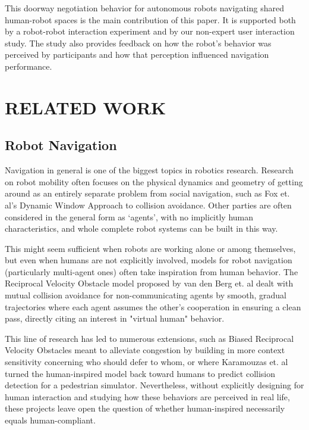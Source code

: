 \documentclass[letterpaper, 10 pt, conference]{ieeeconf}  %
\begin{document}
This doorway negotiation behavior for autonomous robots navigating shared human-robot spaces is the main contribution of this paper. It is supported both by a robot-robot interaction experiment and by our non-expert user interaction study. The study also provides feedback on how the robot’s behavior was perceived by participants and how that perception influenced navigation performance.

\section{RELATED WORK}


\subsection{Robot Navigation}

Navigation in general is one of the biggest topics in robotics research. Research on robot mobility often focuses on the physical dynamics and geometry of getting around as an entirely separate problem from social navigation, such as Fox et. al's Dynamic Window Approach to collision avoidance\cite{c2}. Other parties are often considered in the general form as ‘agents’, with no implicitly human characteristics, and whole complete robot systems can be built in this way. 

This might seem sufficient when robots are working alone or among themselves, but even when humans are not explicitly involved, models for robot navigation (particularly multi-agent ones) often take inspiration from human behavior. The Reciprocal Velocity Obstacle model proposed by van den Berg et. al\cite{c3} dealt with mutual collision avoidance for non-communicating agents by smooth, gradual trajectories where each agent assumes the other’s cooperation in ensuring a clean pass, directly citing an interest in "virtual human" behavior. 

This line of research has led to numerous extensions, such as Biased Reciprocal Velocity Obstacles\cite{c4} meant to alleviate congestion by building in more context sensitivity concerning who should defer to whom, or where Karamouzas et. al\cite{c5} turned the human-inspired model back toward humans to predict collision detection for a pedestrian simulator. Nevertheless, without explicitly designing for human interaction and studying how these behaviors are perceived in real life, these projects leave open the question of whether human-inspired necessarily equals human-compliant.
\end{document}
